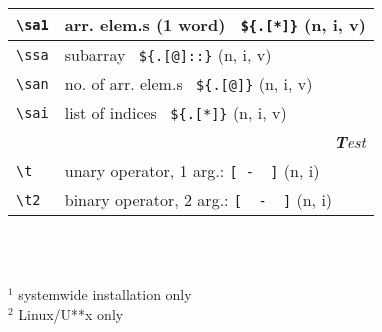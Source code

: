 \documentclass[oneside,11pt,a4paper,DIV18]{scrartcl}
\begin{document}
\begin{center}
\begin{tabular}[]{|p{11mm}|p{59mm}|}
\hline \verb'\sa1' & arr. elem.s (1 word) \ \verb'${.[*]}' \hfill (n, i, v)\\
\hline \verb'\ssa' & subarray \ \verb'${.[@]::}'           \hfill (n, i, v)\\
\hline \verb'\san' & no. of arr. elem.s \ \verb'${.[@]}'   \hfill (n, i, v)\\
\hline \verb'\sai' & list of indices \ \verb'${.[*]}'      \hfill (n, i, v)\\
\hline
\hline
\multicolumn{2}{|r|}{\textsl{\textbf{T}est}}\\
\hline \verb'\t'   &  unary operator, 1 arg.: \verb'[ -  ]'         \hfill (n, i)\\
\hline \verb'\t2'  &  binary operator, 2 arg.: \verb'[  -  ]'        \hfill (n, i)\\
\hline
\end{tabular}\\
%
\begin{minipage}[b]{75mm}%
\scriptsize{%
\vspace{10mm}
\hrulefill\\
$^1$ {systemwide installation only}\\
$^2$ {Linux/U**x only}
}%
\end{minipage}\\
%


\end{center}
\end{document}
